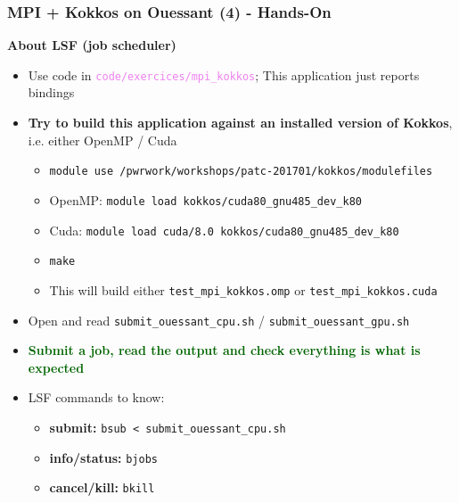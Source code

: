 \begin{frame}[fragile=singleslide]
  \frametitle{MPI + Kokkos on Ouessant (4) - Hands-On}

  {\Large \bf About LSF (job scheduler)}
  
  \begin{itemize}
  \item Use code in \textcolor{violet}{\texttt{code/exercices/mpi\_kokkos}}; This application just reports bindings
  \item {\bf Try to build this application against an installed version of Kokkos}, i.e. either OpenMP / Cuda
    \begin{itemize}
    \item \texttt{module use /pwrwork/workshops/patc-201701/kokkos/modulefiles}
    \item OpenMP: \texttt{module load kokkos/cuda80\_gnu485\_dev\_k80}
    \item Cuda:   \texttt{module load cuda/8.0 kokkos/cuda80\_gnu485\_dev\_k80}
    \item \texttt{make}
    \item This will build either \texttt{test\_mpi\_kokkos.omp} or \texttt{test\_mpi\_kokkos.cuda}
    \end{itemize}
  \item Open and read \texttt{submit\_ouessant\_cpu.sh} / \texttt{submit\_ouessant\_gpu.sh}
  \item {\bf \textcolor{darkgreen}{Submit a job, read the output and check everything is what is expected}}
  \item LSF commands to know:
    \begin{itemize}
    \item {\bf submit:} \texttt{bsub < submit\_ouessant\_cpu.sh}
    \item {\bf info/status:} \texttt{bjobs}
    \item {\bf cancel/kill:} \texttt{bkill}
    \end{itemize}
  \end{itemize}

\end{frame}
